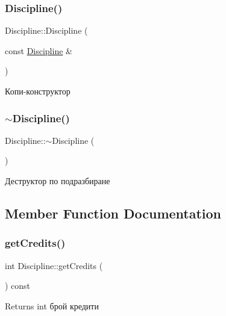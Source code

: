 \subsubsection{\texorpdfstring{Discipline()}{Discipline()}\hspace{0.1cm}{\footnotesize\ttfamily [3/3]}}
{\footnotesize\ttfamily Discipline\+::\+Discipline (\begin{DoxyParamCaption}\item[{const \hyperlink{class_discipline}{Discipline} \&}]{ }\end{DoxyParamCaption})}



Копи-\/конструктор 

\mbox{\label{class_discipline_a454f8a0a084b1ff964752c288d54032a}} 
\subsubsection{\texorpdfstring{$\sim$\+Discipline()}{~Discipline()}}
{\footnotesize\ttfamily Discipline\+::$\sim$\+Discipline (\begin{DoxyParamCaption}{ }\end{DoxyParamCaption})\hspace{0.3cm}{\ttfamily [default]}}



Деструктор по подразбиране 



\subsection{Member Function Documentation}
\mbox{\label{class_discipline_a03a84c2333ece637b1f144bb0e947cc0}} 
\subsubsection{\texorpdfstring{get\+Credits()}{getCredits()}}
{\footnotesize\ttfamily int Discipline\+::get\+Credits (\begin{DoxyParamCaption}{ }\end{DoxyParamCaption}) const}

\begin{DoxyReturn}{Returns}
int брой кредити 
\end{DoxyReturn}
\mbox{\label{class_discipline_a13083fc60e9af78fb960d9a20d298f78}} 
